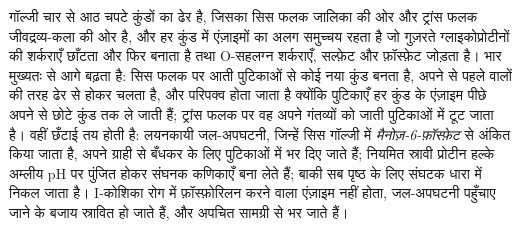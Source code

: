 \begin{proposition}[गॉल्जी]\label{prop:b3:membrane-traffic:golgi}
गॉल्जी चार से आठ चपटे कुंडों का ढेर है, जिसका सिस फलक जालिका की ओर और
ट्रांस फलक जीवद्रव्य-कला की ओर है, और हर कुंड में एंज़ाइमों का अलग
समुच्चय रहता है जो गुज़रते ग्लाइकोप्रोटीनों की शर्कराएँ छाँटता और फिर
बनाता है तथा O-सहलग्न शर्कराएँ, सल्फ़ेट और फ़ॉस्फ़ेट जोड़ता है। भार
मुख्यतः \emph{} से आगे बढ़ता है: सिस फलक पर आती पुटिकाओं
से कोई नया कुंड बनता है, अपने से पहले वालों की तरह ढेर से होकर चलता है,
और परिपक्व होता जाता है क्योंकि  पुटिकाएँ हर कुंड के एंज़ाइम पीछे
अपने से छोटे कुंड तक ले जाती हैं; ट्रांस फलक पर वह अपने गंतव्यों को
जाती पुटिकाओं में टूट जाता है। वहीं छँटाई तय होती है: लयनकायी
जल-अपघटनी, जिन्हें सिस गॉल्जी में \emph{मैनोज़-6-फ़ॉस्फ़ेट} से अंकित
किया जाता है, अपने ग्राही से बँधकर  के लिए  पुटिकाओं
में भर दिए जाते हैं; नियमित स्रावी प्रोटीन हल्के अम्लीय pH पर पुंजित
होकर संघनक कणिकाएँ बना लेते हैं; बाकी सब पृष्ठ के लिए संघटक धारा में
निकल जाता है। I-कोशिका रोग में फ़ॉस्फ़ोरिलन करने वाला एंज़ाइम नहीं होता,
जल-अपघटनी पहुँचाए जाने के बजाय स्रावित हो जाते हैं, और  अपचित
सामग्री से भर जाते हैं।
\end{proposition}

